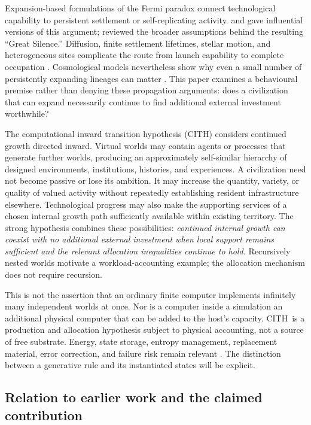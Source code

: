 \documentclass[11pt,a4paper]{article}
\theoremstyle{definition}\newtheorem{definition}{Definition}
\newcommand{\CITH}{\textsc{CITH}}
\begin{document}
Expansion-based formulations of the Fermi paradox connect technological capability to persistent settlement or self-replicating activity. \citet{Hart1975} and \citet{Tipler1980} gave influential versions of this argument; \citet{Brin1983} reviewed the broader assumptions behind the resulting ``Great Silence.'' Diffusion, finite settlement lifetimes, stellar motion, and heterogeneous sites complicate the route from launch capability to complete occupation \citep{NewmanSagan1981,CarrollNellenback2019}. Cosmological models nevertheless show why even a small number of persistently expanding lineages can matter \citep{Olson2015,Hanson2021,Kipping2026}. This paper examines a behavioural premise rather than denying these propagation arguments: does a civilization that can expand necessarily continue to find additional external investment worthwhile?

The computational inward transition hypothesis (\CITH) considers continued growth directed inward. Virtual worlds may contain agents or processes that generate further worlds, producing an approximately self-similar hierarchy of designed environments, institutions, histories, and experiences. A civilization need not become passive or lose its ambition. It may increase the quantity, variety, or quality of valued activity without repeatedly establishing resident infrastructure elsewhere. Technological progress may also make the supporting services of a chosen internal growth path sufficiently available within existing territory. The strong hypothesis combines these possibilities: \emph{continued internal growth can coexist with no additional external investment when local support remains sufficient and the relevant allocation inequalities continue to hold.} Recursively nested worlds motivate a workload-accounting example; the allocation mechanism does not require recursion.

This is not the assertion that an ordinary finite computer implements infinitely many independent worlds at once. Nor is a computer inside a simulation an additional physical computer that can be added to the host's capacity. \CITH\ is a production and allocation hypothesis subject to physical accounting, not a source of free substrate. Energy, state storage, entropy management, replacement material, error correction, and failure risk remain relevant \citep{Landauer1961,Bennett1973,Lloyd2000}. The distinction between a generative rule and its instantiated states will be explicit.

\subsection{Relation to earlier work and the claimed contribution}
\end{document}
